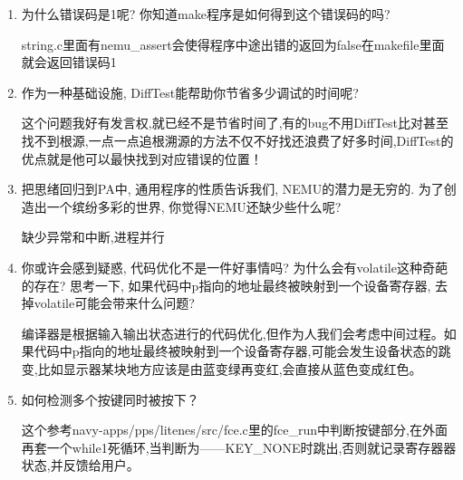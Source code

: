 \documentclass[UTF8,a4paper,10pt]{ctexart}
\begin{document}
{\begin{enumerate}
        这一环套一环的Makefile看的人头晕,Makefile.compile里规定了native的编译参数,Makefile.lib里规定好路径还有lib文件,在terminal\ echo编译
        \item 为什么错误码是1呢? 你知道make程序是如何得到这个错误码的吗?
        
        string.c里面有nemu\_assert会使得程序中途出错的返回为false在makefile里面就会返回错误码1
        \item 作为一种基础设施, DiffTest能帮助你节省多少调试的时间呢?
        
        这个问题我好有发言权,就已经不是节省时间了,有的bug不用DiffTest比对甚至找不到根源,一点一点追根溯源的方法不仅不好找还浪费了好多时间,DiffTest的优点就是他可以最快找到对应错误的位置！
        \item 把思绪回归到PA中, 通用程序的性质告诉我们, NEMU的潜力是无穷的. 为了创造出一个缤纷多彩的世界, 你觉得NEMU还缺少些什么呢?
        
        缺少异常和中断,进程并行
        \item 你或许会感到疑惑, 代码优化不是一件好事情吗? 为什么会有volatile这种奇葩的存在? 思考一下, 如果代码中p指向的地址最终被映射到一个设备寄存器, 去掉volatile可能会带来什么问题?
        
        编译器是根据输入输出状态进行的代码优化,但作为人我们会考虑中间过程。如果代码中p指向的地址最终被映射到一个设备寄存器,可能会发生设备状态的跳变,比如显示器某块地方应该是由蓝变绿再变红,会直接从蓝色变成红色。
        \item 如何检测多个按键同时被按下？
        
        这个参考navy-apps/pps/litenes/src/fce.c里的fce\_run中判断按键部分,在外面再套一个while1死循环,当判断为——KEY\_NONE时跳出,否则就记录寄存器器状态,并反馈给用户。
    \end{enumerate}
}
\end{document}
